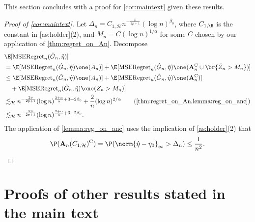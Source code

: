 \documentclass[12pt, reqno]{amsart}
\newif\ifrepeatthm
\newcommand{\A}{\mathbf{A}}
\newcommand{\Hyperparams}{\mathcal{H}}
\newcommand{\leH}{\lesssim_{\mathcal{H}}}
\newcommand{\hateta}{\hat\eta}
\newcommand{\reg}{\mathrm{MSERegret}_n}
\newcommand{\comp}{\mathrm{C}}
\newcommand{\Dinfty}{\norm{\hateta - \eta_0}_{\infty}} %
\numberwithin{equation}{section}
\begin{document}
\begin{appendices}
This section concludes with a proof for \cref{cor:maintext} given these results.




\ifrepeatthm \cormaintext*\fi

\begin{proof}[Proof of \cref{cor:maintext}]

Let $\Delta_n = C_
{1,\Hyperparams} n^{-\frac{p}{2p+1}} (\log n)^{\beta_0}$, where $C_{1,\H}$ is the
constant in \cref{as:holder}(2), and $M_n = C (\log n)^ {1/\alpha}$
for some $C$ chosen by our application of \cref{thm:regret_on_An}.
Decompose \begin{align*}
&\E[\reg(\hat G_n, \hateta)] \\
&=  \E[\reg(\hat G_n, \hateta) \one(A_n)] + \E[\reg(\hat
G_n, \hateta) \one(\A_n^\comp \cup \br{\bar Z_n > M_n})]  \\
&\le \E[\reg(\hat G_n, \hateta) \one(A_n)] + \E[\reg(\hat
G_n, \hateta) \one(\A_n^\comp)] \\
&\quad+ \E[\reg(\hat G_n, \hateta) \one(\bar Z_n > M_n)]
\\
&\leH n^{-\frac{2p}{2p+1}} (\log n)^{\frac{2+\alpha}{\alpha} + 3 + 2\beta_0} + \frac{2}{n} (\log n)^
{2/\alpha} \tag{\cref{thm:regret_on_An,lemma:reg_on_anc}} \\
&\leH n^{-\frac{2p}{2p+1}} (\log n)^{\frac{2+\alpha}{\alpha} + 3 + 2\beta_0}.
\end{align*}  
The application of \cref{lemma:reg_on_anc} uses the implication of \cref{as:holder}(2)
 that \[\P (\A_n(C_{1,\Hyperparams})^\comp) = \P (\Dinfty > \Delta_n) \le \frac{1}
 {n^2}.\qedhere\]
\end{proof}




\section{Proofs of other results stated in the main text}

\ifrepeatthm
  \thmminimaxlower*
\fi


\end{appendices}
\end{document}

